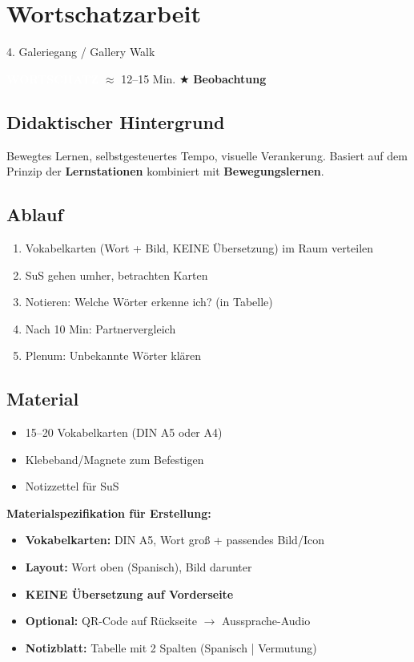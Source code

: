 \documentclass[11pt, a4paper]{article}
\newcommand{\tagWortschatz}{\colorbox{wortschatz}{\textcolor{white}{\footnotesize\textbf{WORTSCHATZ}}}}
\newcommand{\zeit}[1]{\textcolor{grau}{\footnotesize $\approx$ #1 Min.}}
\newcommand{\beobachtung}{\textcolor{erfolg}{\footnotesize $\bigstar$ \textbf{Beobachtung}}}
\begin{document}
\section{Wortschatzarbeit}

\begin{methode}{4. Galeriegang / Gallery Walk}

\tagWortschatz{} \zeit{12--15} \hfill \beobachtung

\subsection*{Didaktischer Hintergrund}
Bewegtes Lernen, selbstgesteuertes Tempo, visuelle Verankerung. Basiert auf dem Prinzip der \textbf{Lernstationen} kombiniert mit \textbf{Bewegungslernen}.

\subsection*{Ablauf}
\begin{enumerate}[leftmargin=*]
    \item Vokabelkarten (Wort + Bild, KEINE Übersetzung) im Raum verteilen
    \item SuS gehen umher, betrachten Karten
    \item Notieren: Welche Wörter erkenne ich? (in Tabelle)
    \item Nach 10 Min: Partnervergleich
    \item Plenum: Unbekannte Wörter klären
\end{enumerate}

\subsection*{Material}
\begin{materialbox}
\begin{itemize}[label=$\square$, leftmargin=*]
    \item 15--20 Vokabelkarten (DIN A5 oder A4)
    \item Klebeband/Magnete zum Befestigen
    \item Notizzettel für SuS
\end{itemize}

\textbf{Materialspezifikation für Erstellung:}
\begin{itemize}[leftmargin=*]
    \item \textbf{Vokabelkarten:} DIN A5, Wort groß + passendes Bild/Icon
    \item \textbf{Layout:} Wort oben (Spanisch), Bild darunter
    \item \textbf{KEINE Übersetzung auf Vorderseite}
    \item \textbf{Optional:} QR-Code auf Rückseite $\rightarrow$ Aussprache-Audio
    \item \textbf{Notizblatt:} Tabelle mit 2 Spalten (Spanisch | Vermutung)
\end{itemize}
\end{materialbox}


\end{methode}
\end{document}
